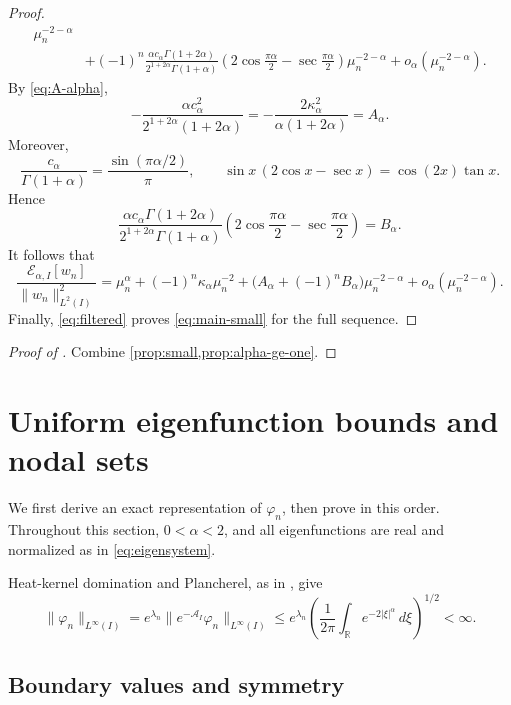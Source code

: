 \documentclass[11pt]{amsart}
\numberwithin{equation}{section}
\theoremstyle{remark}
\newcommand{\R}{\mathbb R}
\newcommand{\norm}[2][]{\lVert #2\rVert_{#1}}
\newcommand{\calE}{\mathcal E}
\begin{document}
\begin{proof}
\[\begin{aligned}
 \mu_n^{-2-\alpha}\\
 &+(-1)^n\frac{\alpha c_\alpha\Gamma(1+2\alpha)}
 {2^{1+2\alpha}\Gamma(1+\alpha)}
 \left(2\cos\frac{\pi\alpha}{2}
 -\sec\frac{\pi\alpha}{2}\right)
 \mu_n^{-2-\alpha}+o_\alpha(\mu_n^{-2-\alpha}).
 \end{aligned}
\]
By \eqref{eq:A-alpha},
\[
 -\frac{\alpha c_\alpha^2}{2^{1+2\alpha}(1+2\alpha)}
 =-\frac{2\kappa_\alpha^2}{\alpha(1+2\alpha)}=A_\alpha.
\]
Moreover,
\[
 \frac{c_\alpha}{\Gamma(1+\alpha)}
 =\frac{\sin(\pi\alpha/2)}\pi,
 \qquad
 \sin x\,(2\cos x-\sec x)=\cos(2x)\tan x.
\]
Hence
\[
 \frac{\alpha c_\alpha\Gamma(1+2\alpha)}
 {2^{1+2\alpha}\Gamma(1+\alpha)}
 \left(2\cos\frac{\pi\alpha}{2}
 -\sec\frac{\pi\alpha}{2}\right)=B_\alpha.
\]
It follows that
\[
 \frac{\calE_{\alpha,I}[w_n]}{\norm[L^2(I)]{w_n}^2}
 =\mu_n^\alpha+(-1)^n\kappa_\alpha\mu_n^{-2}
 +\bigl(A_\alpha+(-1)^nB_\alpha\bigr)\mu_n^{-2-\alpha}
 +o_\alpha(\mu_n^{-2-\alpha}).
\]
Finally, \eqref{eq:filtered} proves \eqref{eq:main-small} for the full
sequence.
\end{proof}

\begin{proof}[Proof of ]
Combine \cref{prop:small,prop:alpha-ge-one}.
\end{proof}




\section{Uniform eigenfunction bounds and nodal sets}
\label{sec:Linfty-proof}
\label{sec:nodal}

We first derive an exact representation of $\varphi_n$, then prove
 in this order. Throughout this section,
$0<\alpha<2$, and all eigenfunctions are real and normalized as in
\eqref{eq:eigensystem}.

Heat-kernel domination and Plancherel, as in
\cite[proof of Proposition~2]{KwasnickiInterval}, give
\begin{equation}\label{eq:fixed-eigenfunction-bounded}
 \norm[L^\infty(I)]{\varphi_n}
 =e^{\lambda_n}\norm[L^\infty(I)]{e^{-\mathcal A_I}\varphi_n}
 \le e^{\lambda_n}
 \left(\frac1{2\pi}\int_\R e^{-2|\xi|^\alpha}\,d\xi\right)^{1/2}<\infty.
\end{equation}


\subsection{Boundary values and symmetry}
\label{subsec:nodal-preliminaries}
\end{document}
